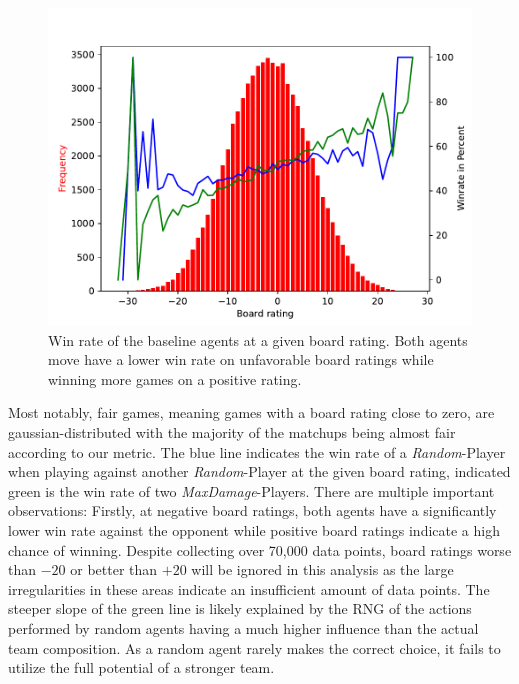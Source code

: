 \begin{figure}[h]
	\centering
	\includegraphics[width=\textwidth]{images/boardrating.pdf}
	\caption{Win rate of the baseline agents at a given board rating. Both agents
  move have a lower win rate on unfavorable board ratings while winning more games on a positive rating.}
	\label{fig:wr-board-rating}
\end{figure}
Most notably, fair games, meaning games with a board rating close to zero, are gaussian-distributed with the majority
of the matchups being almost fair according to our metric. The blue line indicates the win rate of a \textit{Random}-Player
when playing against another \textit{Random}-Player at the given board rating, indicated green is the win rate of two
\textit{MaxDamage}-Players. There are multiple important observations: Firstly, at negative board ratings, both
agents have a significantly lower win rate against the opponent while positive board ratings indicate a high chance of 
winning. Despite collecting over 70,000 data points, board ratings worse than $-20$ or better than $+20$ will be ignored in this analysis
as the large irregularities in these areas indicate an insufficient amount of data points. 
The steeper slope of the green line is likely explained by the \ac{RNG} of the actions performed by random agents having 
a much higher influence than the actual team composition. As a random agent rarely makes the correct choice, it 
fails to utilize the full potential of a stronger team. 

